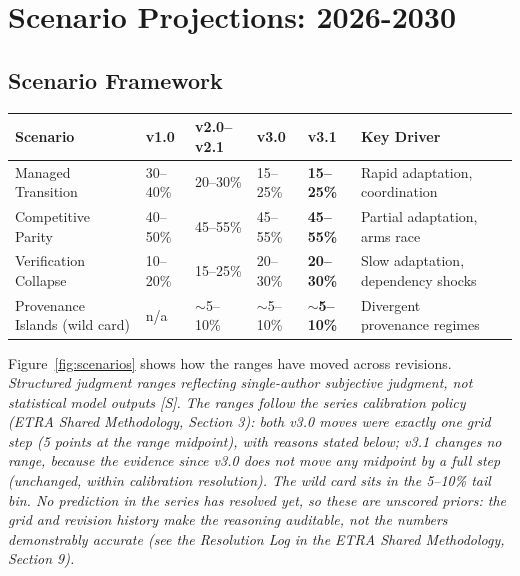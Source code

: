 \documentclass[11pt,letterpaper]{article}
\begin{document}
\vspace{0.8cm}

\section{Scenario Projections: 2026-2030}

\subsection{Scenario Framework}

\begin{center}
\small
\begin{tabularx}{\linewidth}{ZY{1.3}Y{0.6}Y{0.75}Y{0.6}Y{0.65}Y{1.1}}
\toprule
\textbf{Scenario} & \textbf{v1.0} & \textbf{v2.0--v2.1} & \textbf{v3.0} & \textbf{v3.1} & \textbf{Key Driver} \\
\midrule
Managed Transition & 30--40\% & 20--30\% & 15--25\% & \textbf{15--25\%} & Rapid adaptation, coordination \\
Competitive Parity & 40--50\% & 45--55\% & 45--55\% & \textbf{45--55\%} & Partial adaptation, arms race \\
Verification Collapse & 10--20\% & 15--25\% & 20--30\% & \textbf{20--30\%} & Slow adaptation, dependency shocks \\
Provenance Islands (wild card) & n/a & $\sim$5--10\% & $\sim$5--10\% & \textbf{$\sim$5--10\%} & Divergent provenance regimes \\
\bottomrule
\end{tabularx}
\end{center}

Figure~\ref{fig:scenarios} shows how the ranges have moved across revisions. \textit{Structured judgment ranges reflecting single-author subjective judgment, not statistical model outputs [S]. The ranges follow the series calibration policy (ETRA Shared Methodology, Section 3): both v3.0 moves were exactly one grid step (5 points at the range midpoint), with reasons stated below; v3.1 changes no range, because the evidence since v3.0 does not move any midpoint by a full step (unchanged, within calibration resolution). The wild card sits in the 5--10\% tail bin. No prediction in the series has resolved yet, so these are unscored priors: the grid and revision history make the reasoning auditable, not the numbers demonstrably accurate (see the Resolution Log in the ETRA Shared Methodology, Section 9).}
\end{document}
